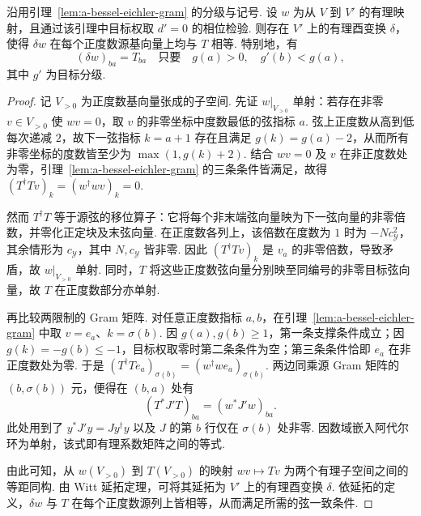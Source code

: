 \begin{lemma}[通过幂幺检验的有理映射弦代表]
\label{lem:a-bessel-rational-chord-representative}
\emitthmsource
沿用引理~\ref{lem:a-bessel-eichler-gram} 的分级与记号. 设 $w$ 为从 $V$ 到 $V'$ 的有理映射，且通过该引理中目标权取 $d'=0$ 的相位检验. 则存在 $V'$ 上的有理酉变换 $\delta$，使得 $\delta w$ 在每个正度数源基向量上均与 $T$ 相等. 特别地，有
\[
 (\delta w)_{ba}=T_{ba}
 \quad\text{只要}\quad
        g(a)>0,\quad g'(b)<g(a),
\]
其中 $g'$ 为目标分级.
\end{lemma}
\begin{proof}
记 $V_{>0}$ 为正度数基向量张成的子空间. 先证 $w|_{V_{>0}}$ 单射：若存在非零 $v\in V_{>0}$ 使 $wv=0$，取 $v$ 的非零坐标中度数最低的弦指标 $a$. 弦上正度数从高到低每次递减 $2$，故下一弦指标 $k=a+1$ 存在且满足 $g(k)=g(a)-2$，从而所有非零坐标的度数皆至少为 $\max(1,g(k)+2)$. 结合 $wv=0$ 及 $v$ 在非正度数处为零，引理~\ref{lem:a-bessel-eichler-gram} 的三条条件皆满足，故得 $(T^\dagger T v)_k=(w^\dagger wv)_k=0$.

然而 $T^\dagger T$ 等于源弦的移位算子：它将每个非末端弦向量映为下一弦向量的非零倍数，并零化正定块及末弦向量. 在正度数各列上，该倍数在度数为 $1$ 时为 $-Nc_{\mathcal Y}^2$，其余情形为 $c_{\mathcal Y}$，其中 $N,c_{\mathcal Y}$ 皆非零. 因此 $(T^\dagger Tv)_k$ 是 $v_a$ 的非零倍数，导致矛盾，故 $w|_{V_{>0}}$ 单射. 同时，$T$ 将这些正度数弦向量分别映至同编号的非零目标弦向量，故 $T$ 在正度数部分亦单射.

再比较两限制的 Gram 矩阵. 对任意正度数指标 $a,b$，在引理~\ref{lem:a-bessel-eichler-gram} 中取 $v=e_a$、$k=\sigma(b)$. 因 $g(a),g(b)\ge1$，第一条支撑条件成立；因 $g(k)=-g(b)\le-1$，目标权取零时第二条条件为空；第三条条件恰即 $e_a$ 在非正度数处为零. 于是 $(T^\dagger T e_a)_{\sigma(b)}=(w^\dagger w e_a)_{\sigma(b)}$. 两边同乘源 Gram 矩阵的 $(b,\sigma(b))$ 元，便得在 $(b,a)$ 处有
\[
 (T^\ast J'T)_{ba}=(w^\ast J'w)_{ba}.
\]
此处用到了 $y^\ast J'y=Jy^\dagger y$ 以及 $J$ 的第 $b$ 行仅在 $\sigma(b)$ 处非零. 因数域嵌入阿代尔环为单射，该式即有理系数矩阵之间的等式.

由此可知，从 $w(V_{>0})$ 到 $T(V_{>0})$ 的映射 $w v\mapsto Tv$ 为两个有理子空间之间的等距同构. 由 Witt 延拓定理，可将其延拓为 $V'$ 上的有理酉变换 $\delta$. 依延拓的定义，$\delta w$ 与 $T$ 在每个正度数源列上皆相等，从而满足所需的弦一致条件.
\end{proof}

